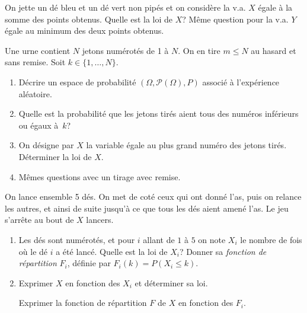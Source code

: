 \documentclass[a4paper,12pt,reqno]{amsart}
\begin{document}


\begin{exo}

  On jette un dé bleu et un dé vert non pipés et on considère la v.a. $X$ égale à
  la somme des points obtenus. Quelle est la loi de $X$? Même question pour la v.a. $Y$ égale au minimum des deux points obtenus.

\end{exo}

\begin{exo}

  Une urne contient $N$ jetons numérotés de 1 à $N$. On en tire $m\leq N$ au hasard et sans remise. Soit $k\in \{1,\ldots,N\}$.

  \begin{enumerate}
    \item Décrire  un espace de probabilité $(\Omega,\mathcal{P}(\Omega),P)$  associé à l'expérience aléatoire.
    \item Quelle est la probabilité que les jetons tirés aient tous des numéros inférieurs ou égaux à~$k$?
    \item On désigne par $X$ la variable égale au plus grand numéro des jetons tirés. Déterminer la loi de $X$.
    \item Mêmes questions avec un tirage avec remise.
  \end{enumerate}

\end{exo}

\begin{exo}

  On lance ensemble 5 dés. On met de coté ceux qui ont donné l'as, puis on relance les autres, et ainsi de suite jusqu'à ce que tous les dés aient amené l'as. Le jeu s'arrête au bout de $ X $ lancers.

  \begin{enumerate}
    \item Les dés sont numérotés, et pour $ i $ allant de $ 1 $ à $ 5 $ on note $ X_i $ le nombre de fois où le dé $ i $ a été lancé. Quelle est la loi de $ X_i $? Donner sa \emph{fonction de répartition} $ F_i $, définie par $F_i(k)=P(X_{i}\leq k)$.
    \item Exprimer $ X $ en fonction des $ X_i $ et déterminer sa loi.

    \begin{indication}
      Exprimer la fonction de répartition $ F $ de $ X $ en fonction des $ F_i $.
    \end{indication}
  \end{enumerate}

\end{exo}
\end{document}
